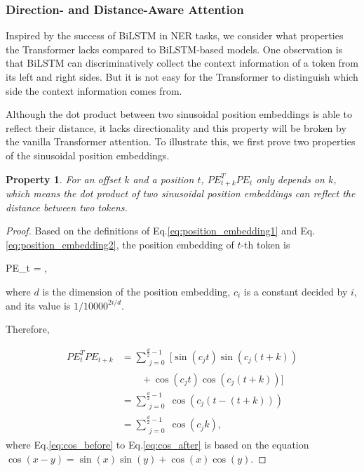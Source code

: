 \documentclass[11pt,a4paper]{article}
\newtheorem{prop}{Property}
\begin{document}
\subsubsection{Direction- and Distance-Aware Attention}

Inspired by the success of BiLSTM in NER tasks, we consider what properties the Transformer lacks compared to BiLSTM-based models. One observation is that BiLSTM can discriminatively collect the context information of a token from its left and right sides. But it is not easy for the Transformer to distinguish which side the context information comes from.

Although the dot product between two sinusoidal position embeddings is able to reflect their distance, it lacks directionality and this property will be broken by the vanilla Transformer attention. To illustrate this, we first prove two properties of the sinusoidal position embeddings.

\begin{prop}
  For an offset $k$ and a position $t$, $PE_{t+k}^TPE_{t}$ only depends on $k$, which means the dot product of two sinusoidal position embeddings can reflect the distance between two tokens.
\end{prop}
\begin{proof}
  Based on the definitions of Eq.\eqref{eq:position_embedding1} and Eq.\eqref{eq:position_embedding2},
the position embedding of $t$-th token is
\begin{seequation}
  PE_t  = ,
\end{seequation}
where $d$ is the dimension of the position embedding, $c_i$ is a constant decided by $i$, and its value is $1/10000^{2i/d}$.

Therefore,

 \vspace{-1em}
{\small
\begin{align}
 PE_t^TPE_{t+k} & = \sum_{\substack{j=0}}^{\frac{d}{2}-1} [\sin(c_jt)\sin(c_j(t+k))\nonumber \\
                & \qquad + \cos(c_jt)\cos(c_j(t+k))] \label{eq:cos_before}\\
               & = \sum_{\substack{j=0}}^{\frac{d}{2}-1} \cos(c_j(t-(t+k))) \label{eq:cos_after}\\
               & = \sum_{\substack{j=0}}^{\frac{d}{2}-1} \cos(c_jk),
\end{align}
}where Eq.\eqref{eq:cos_before} to Eq.\eqref{eq:cos_after} is based on the equation $\cos(x-y) = \sin(x)\sin(y) + \cos(x)\cos(y)$.
\end{proof}
\end{document}
